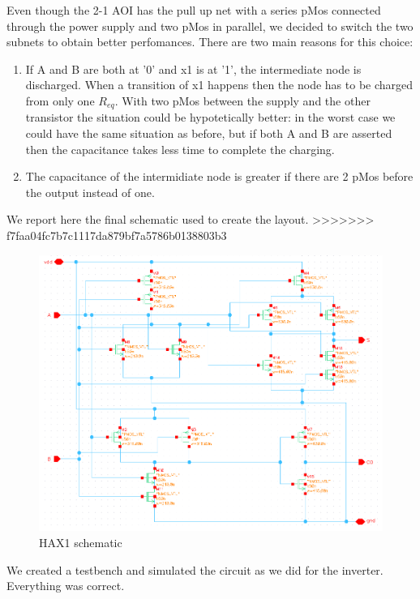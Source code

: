 \documentclass[a4paper]{article}
\begin{document}
Even though the 2-1 AOI has the pull up net with a series pMos connected through the power supply and two pMos in parallel, we decided to switch the two subnets to obtain better perfomances. There are two main reasons for this choice:
\begin{enumerate}
\item If A and B are both at '0' and x1 is at '1', the intermediate node is discharged. When a transition of x1 happens then the node has to be charged from only one $R_{eq}$. With two pMos between the supply and the other transistor the situation could be hypotetically better: in the worst case we could have the same situation as before, but if both A and B are asserted then the capacitance takes less time to complete the charging.  
\item The capacitance of the intermidiate node is greater if there are 2 pMos before the output instead of one.
\end{enumerate}

We report here the final schematic used to create the layout.
>>>>>>> f7faa04fc7b7c1117da879bf7a5786b0138803b3

\begin{figure}[H]
      \centering
       \includegraphics[width=\linewidth]{./Images/HA/HAX1_schematic.png}
\caption{HAX1 schematic}
\label{fig: HAX1_sch}
\end{figure}

We created a testbench and simulated the circuit as we did for the inverter. Everything was correct.
\end{document}
